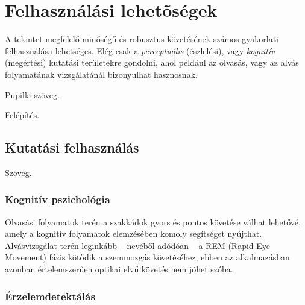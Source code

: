 \chapter{Felhasználási lehetõségek}\label{sect:felhasznalas}

A tekintet megfelelő minőségű és robusztus követésének számos gyakorlati felhasználása lehetséges. Elég csak a \emph{perceptuális} (észlelési), vagy \emph{kognitív} (megértési) kutatási területekre gondolni, ahol például az olvasás, vagy az alvás folyamatának vizsgálatánál bizonyulhat hasznosnak.

Pupilla szöveg.

\bigskip

Felépítés.

\section{Kutatási felhasználás}\label{sect:tudomanyos}

Szöveg.

\subsection{Kognitív pszichológia}\label{sect:kognitiv}

Olvasási folyamatok terén a szakkádok gyors és pontos követése válhat lehetővé, amely a kognitív folyamatok elemzésében komoly segítséget nyújthat. Alvásvizsgálat terén leginkább -- nevéből adódóan -- a REM (Rapid Eye Movement) fázis kötődik a szemmozgás követéséhez, ebben az alkalmazásban azonban értelemszerűen optikai elvű követés nem jöhet szóba.

\subsection{Érzelemdetektálás}\label{sect:erzelem}


